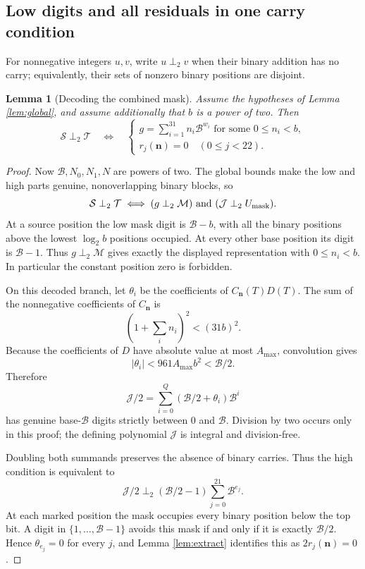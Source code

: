 \documentclass[11pt,a4paper]{article}
\newtheorem{lemma}[theorem]{Lemma}
\theoremstyle{remark}
\newcommand{\B}{\mathcal B}
\newcommand{\Mc}{\mathcal M}
\newcommand{\Tc}{\mathcal T}
\newcommand{\Jc}{\mathcal J}
\newcommand{\Sc}{\mathcal S}
\newcommand{\nocarry}{\mathrel{\perp_2}}
\begin{document}
\subsection{Low digits and all residuals in one carry condition}
For nonnegative integers \(u,v\), write \(u\nocarry v\) when their
binary addition has no carry; equivalently, their sets of nonzero
binary positions are disjoint.
\begin{lemma}[Decoding the combined mask]\label{lem:mask}
Assume the hypotheses of Lemma \ref{lem:global}, and assume additionally
that \(b\) is a power of two. Then
\[
\Sc\nocarry\Tc
\quad\Longleftrightarrow\quad
\left\{
\begin{array}{l}
g=\displaystyle\sum_{i=1}^{31}n_i\B^{w_i}
\text{ for some }0\le n_i<b,\\
r_j(\mathbf n)=0\quad(0\le j<22).
\end{array}\right.
\]
\end{lemma}
\begin{proof}
Now \(\B,N_0,N_1,N\) are powers of two. The global bounds make the
low and high parts genuine, nonoverlapping binary blocks, so
\[
\Sc\nocarry\Tc
\iff (g\nocarry\Mc)\ \text{and}\ (\Jc\nocarry U_{\rm mask}).
\]
At a source position the low mask digit is \(\B-b\), with all the
binary positions above the lowest \(\log_2 b\) positions occupied.
At every other base position its digit is \(\B-1\). Thus
\(g\nocarry\Mc\) gives exactly the displayed representation with
\(0\le n_i<b\). In particular the constant position zero is forbidden.

On this decoded branch, let \(\theta_i\) be the coefficients of
\(C_{\mathbf n}(T)D(T)\). The sum of the nonnegative coefficients
of \(C_{\mathbf n}\) is
\[
\left(1+\sum_i n_i\right)^2<(31b)^2.
\]
Because the coefficients of \(D\) have absolute value at most
\(A_{\max}\), convolution gives
\[
|\theta_i|<961A_{\max}b^2<\B/2.
\]
Therefore
\[
\Jc/2=\sum_{i=0}^{Q}(\B/2+\theta_i)\B^i
\]
has genuine base-\(\B\) digits strictly between \(0\) and \(\B\).
Division by two occurs only in this proof; the defining polynomial
\(\Jc\) is integral and division-free.

Doubling both summands preserves the absence of binary carries.
Thus the high condition is equivalent to
\[
\Jc/2\nocarry
(\B/2-1)\sum_{j=0}^{21}\B^{e_j}.
\]
At each marked position the mask occupies every binary position
below the top bit. A digit in \(\{1,\ldots,\B-1\}\) avoids this
mask if and only if it is exactly \(\B/2\). Hence
\(\theta_{e_j}=0\) for every \(j\), and Lemma \ref{lem:extract}
identifies this as \(2r_j(\mathbf n)=0\).
\end{proof}
\end{document}
